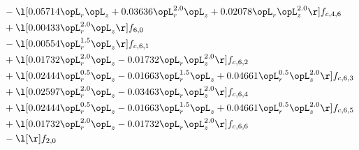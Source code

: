 \begin{alignat}{2}
& - \l[  0.05714 \opL_r \opL_z +  0.03636 \opL_r^{2.0} \opL_z +  0.02078 \opL_r \opL_z^{2.0}  \r] f_{c,4,6} \nonumber \\ 
& + \l[  0.00433 \opL_r^{2.0} \opL_z  \r] f_{6,0} \nonumber \\ 
& - \l[  0.00554 \opL_r^{1.5} \opL_z  \r] f_{c,6,1} \nonumber \\ 
& + \l[  0.01732 \opL_r^{2.0} \opL_z   -0.01732 \opL_r \opL_z^{2.0}  \r] f_{c,6,2} \nonumber \\ 
& + \l[  0.02444 \opL_r^{0.5} \opL_z   -0.01663 \opL_r^{1.5} \opL_z +  0.04661 \opL_r^{0.5} \opL_z^{2.0}  \r] f_{c,6,3} \nonumber \\ 
& + \l[  0.02597 \opL_r^{2.0} \opL_z   -0.03463 \opL_r \opL_z^{2.0}  \r] f_{c,6,4} \nonumber \\ 
& + \l[  0.02444 \opL_r^{0.5} \opL_z   -0.01663 \opL_r^{1.5} \opL_z +  0.04661 \opL_r^{0.5} \opL_z^{2.0}  \r] f_{c,6,5} \nonumber \\ 
& + \l[  0.01732 \opL_r^{2.0} \opL_z   -0.01732 \opL_r \opL_z^{2.0}  \r] f_{c,6,6} \nonumber \\ 
& - \l[  \r] f_{2,0} \nonumber \\ 
\end{alignat} 


